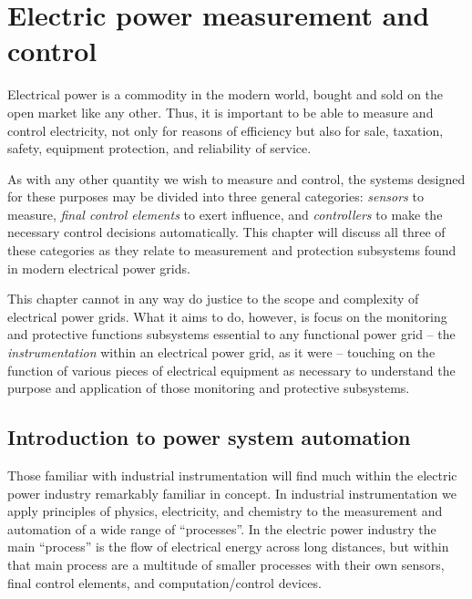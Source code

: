 
\chapter{Electric power measurement and control}

Electrical power is a commodity in the modern world, bought and sold on the open market like any other.  Thus, it is important to be able to measure and control electricity, not only for reasons of efficiency but also for sale, taxation, safety, equipment protection, and reliability of service.

As with any other quantity we wish to measure and control, the systems designed for these purposes may be divided into three general categories: \textit{sensors} to measure, \textit{final control elements} to exert influence, and \textit{controllers} to make the necessary control decisions automatically.  This chapter will discuss all three of these categories as they relate to measurement and protection subsystems found in modern electrical power grids.

This chapter cannot in any way do justice to the scope and complexity of electrical power grids.  What it aims to do, however, is focus on the monitoring and protective functions subsystems essential to any functional power grid -- the \textit{instrumentation} within an electrical power grid, as it were -- touching on the function of various pieces of electrical equipment as necessary to understand the purpose and application of those monitoring and protective subsystems.  













\filbreak
\section{Introduction to power system automation}

Those familiar with industrial instrumentation will find much within the electric power industry remarkably familiar in concept.  In industrial instrumentation we apply principles of physics, electricity, and chemistry to the measurement and automation of a wide range of ``processes''.  In the electric power industry the main ``process'' is the flow of electrical energy across long distances, but within that main process are a multitude of smaller processes with their own sensors, final control elements, and computation/control devices.

